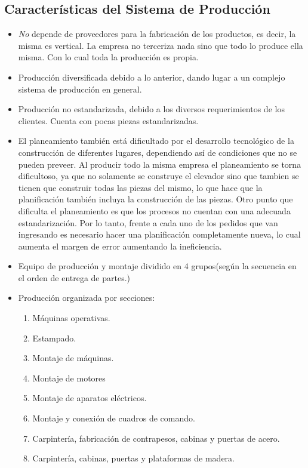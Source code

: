 \subsection{Caracter\'{i}sticas del Sistema de Producci\'{o}n}
\begin{itemize}
	\item \emph{No} depende de proveedores para la fabricaci\'{o}n de los productos, es decir, la misma es vertical. La empresa no terceriza nada sino que todo lo produce ella misma. Con lo cual toda la producci\'{o}n es propia.
	\item Producci\'{o}n diversificada debido a lo anterior, dando lugar a un complejo sistema de producci\'on en general.
	\item Producci\'{o}n no estandarizada, debido a los diversos requerimientos de los clientes. Cuenta con pocas piezas estandarizadas.
	\item El planeamiento tambi\'{e}n est\'a dificultado por el desarrollo tecnol\'ogico de la construcci\'on de diferentes lugares, dependiendo as\'i de condiciones que no se pueden preveer. Al producir todo la misma empresa el planeamiento se torna dificultoso, ya que no solamente se construye el elevador sino que tambien se tienen que construir todas las piezas del mismo, lo que hace que la planificaci\'{o}n tambi\'{e}n incluya la construcci\'{o}n de las piezas. Otro punto que dificulta el planeamiento es que los procesos no cuentan con una adecuada estandarizaci\'{o}n. Por lo tanto, frente a cada uno de los pedidos que van ingresando es necesario hacer una planificaci\'{o}n completamente nueva, lo cual aumenta el margen de error aumentando la ineficiencia.
	\item Equipo de producci\'{o}n y montaje dividido en 4 grupos(seg\'{u}n la secuencia en el orden de entrega de partes.)
	\item Producci\'{o}n organizada por secciones:
	\begin{enumerate}
		\item M\'{a}quinas operativas.
		\item Estampado.
		\item Montaje de m\'{a}quinas.
		\item Montaje de motores
		\item Montaje de aparatos el\'{e}ctricos.
		\item Montaje y conexi\'{o}n de cuadros de comando.
		\item Carpinter\'{i}a, fabricaci\'{o}n de contrapesos, cabinas y 	puertas de acero.
		\item Carpinter\'ia, cabinas, puertas y plataformas de madera.

\end{enumerate}
\end{itemize}
